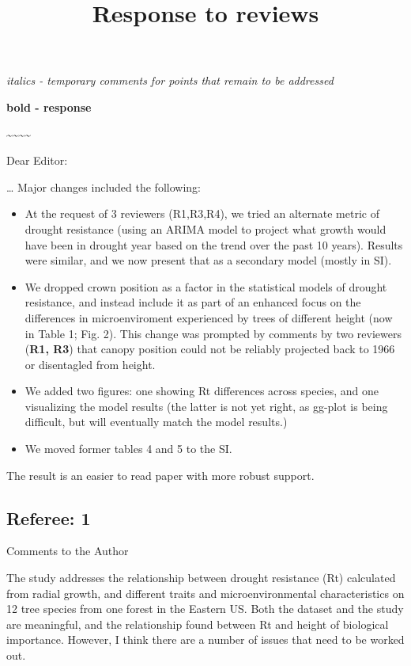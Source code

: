 \documentclass[
]{article}
\title{Response to reviews}
\author{}
\date{\vspace{-2.5em}}
\begin{document}
\maketitle

\emph{italics - temporary comments for points that remain to be
addressed}

\textbf{bold - response}

\textasciitilde\textasciitilde\textasciitilde\textasciitilde{}

Dear Editor:

\ldots{} Major changes included the following:

\begin{itemize}
\item
  At the request of 3 reviewers (R1,R3,R4), we tried an alternate metric
  of drought resistance (using an ARIMA model to project what growth
  would have been in drought year based on the trend over the past 10
  years). Results were similar, and we now present that as a secondary
  model (mostly in SI).
\item
  We dropped crown position as a factor in the statistical models of
  drought resistance, and instead include it as part of an enhanced
  focus on the differences in microenviroment experienced by trees of
  different height (now in Table 1; Fig. 2). This change was prompted by
  comments by two reviewers (\textbf{R1, R3}) that canopy position could
  not be reliably projected back to 1966 or disentagled from height.
\item
  We added two figures: one showing Rt differences across species, and
  one visualizing the model results (the latter is not yet right, as
  gg-plot is being difficult, but will eventually match the model
  results.)
\item
  We moved former tables 4 and 5 to the SI.
\end{itemize}

The result is an easier to read paper with more robust support.

\newpage

\hypertarget{referee-1}{%
\subsection{Referee: 1}\label{referee-1}}

Comments to the Author

The study addresses the relationship between drought resistance (Rt)
calculated from radial growth, and different traits and
microenvironmental characteristics on 12 tree species from one forest in
the Eastern US. Both the dataset and the study are meaningful, and the
relationship found between Rt and height of biological importance.
However, I think there are a number of issues that need to be worked
out.
\end{document}
